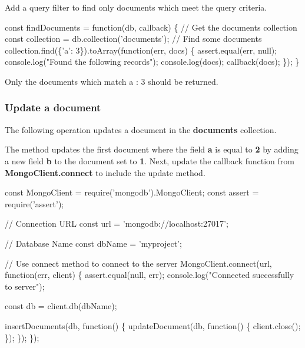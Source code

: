 Add a query filter to find only documents which meet the query criteria.


\begin{DoxyCode}
const findDocuments = function(db, callback) \{
  // Get the documents collection
  const collection = db.collection('documents');
  // Find some documents
  collection.find(\{'a': 3\}).toArray(function(err, docs) \{
    assert.equal(err, null);
    console.log("Found the following records");
    console.log(docs);
    callback(docs);
  \});
\}
\end{DoxyCode}


Only the documents which match {\ttfamily \textquotesingle{}a\textquotesingle{} \+: 3} should be returned.

\subsubsection*{Update a document}

The following operation updates a document in the {\bfseries documents} collection.




The method updates the first document where the field {\bfseries a} is equal to {\bfseries 2} by adding a new field {\bfseries b} to the document set to {\bfseries 1}. Next, update the callback function from {\bfseries Mongo\+Client.\+connect} to include the update method.


\begin{DoxyCode}
const MongoClient = require('mongodb').MongoClient;
const assert = require('assert');

// Connection URL
const url = 'mongodb://localhost:27017';

// Database Name
const dbName = 'myproject';

// Use connect method to connect to the server
MongoClient.connect(url, function(err, client) \{
  assert.equal(null, err);
  console.log("Connected successfully to server");

  const db = client.db(dbName);

  insertDocuments(db, function() \{
    updateDocument(db, function() \{
      client.close();
    \});
  \});
\});
\end{DoxyCode}


